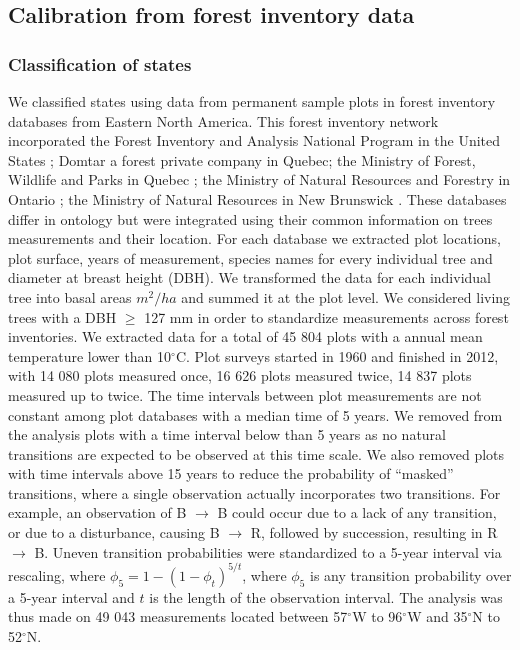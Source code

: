 \subsection*{Calibration from forest inventory data}

\subsubsection*{Classification of states}

We classified states using data from permanent sample plots in forest inventory databases from
Eastern North America. This forest inventory network incorporated the Forest Inventory and Analysis
National Program in the United States \citep{Inventory2007a}; Domtar a forest private company in
Quebec; the Ministry of Forest, Wildlife and Parks in Quebec \citep{MRN2013}; the Ministry of
Natural Resources and Forestry in Ontario \citep{OMNR2014}; the Ministry of Natural Resources in New
Brunswick \citep{Porter2001}. These databases differ in ontology but were integrated using their
common information on trees measurements and their location. For each database we extracted plot
locations, plot surface, years of measurement, species names for every individual tree and diameter
at breast height (DBH). We transformed the data for each individual tree into basal areas $m^2/ha$
and summed it at the plot level. We considered living trees with a DBH $\ge$ 127 mm in order to
standardize measurements across forest inventories. We extracted data for a total of 45 804 plots
with a annual mean temperature lower than 10$^{\circ}$C. Plot surveys started in 1960 and finished
in 2012, with 14 080 plots measured once, 16 626 plots measured twice, 14 837 plots measured up to
twice. The time intervals between plot measurements are not constant among plot databases with a
median time of 5 years. We removed from the analysis plots with a time interval below than 5 years
as no natural transitions are expected to be observed at this time scale. We also removed plots with
time intervals above 15 years to reduce the probability of ``masked'' transitions, where a single
observation actually incorporates two transitions. For example, an observation of B $\rightarrow$ B
could occur due to a lack of any transition, or due to a disturbance, causing B $\rightarrow$ R,
followed by succession, resulting in R $\rightarrow$ B.  Uneven transition probabilities were
standardized to a 5-year interval via rescaling, where $\phi_5 = 1 - (1 - \phi_{t})^{5/t}$, where
$\phi_5$ is any transition probability over a 5-year interval and $t$ is the length of the
observation interval. The analysis was thus made on 49 043 measurements located between
57$^{\circ}$W to 96$^{\circ}$W and 35$^{\circ}$N to 52$^{\circ}$N.

